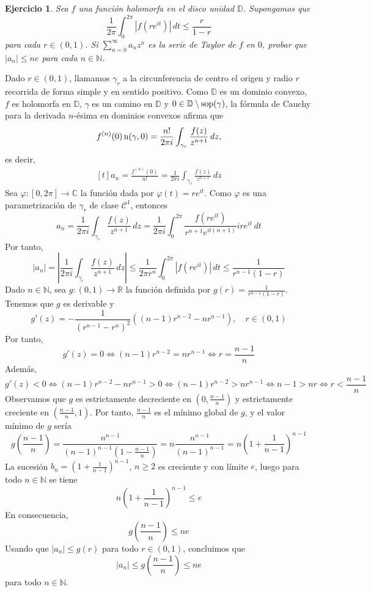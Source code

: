 \documentclass[11pt]{report}
\makeatletter
\renewenvironment{proof}[1][\proofname]{\par
  \pushQED{\qed}%
  \normalfont \topsep\z@skip %
  \trivlist
  \item[\hskip\labelsep
        \itshape
    #1\@addpunct{.}]\ignorespaces
}{%
  \popQED\endtrivlist\@endpefalse
}
\newcommand{\R}{\mathbb R}
\newcommand{\N}{\mathbb N}
\newcommand{\C}{\mathbb C}
\newcommand{\D}{\mathbb D}
\newtheorem{exercise}{Ejercicio}
\makeatother
\begin{document}
\begin{exercise}
Sea $f$ una función holomorfa en el disco unidad $\D$. Supongamos que
\[\frac{1}{2\pi} \int_0^{2\pi} |f(re^{it})| \, dt \leq \frac{r}{1-r}\]
para cada $r \in (0,1)$. Si $\sum_{n=0}^\infty a_nz^n$ es la serie de Taylor de $f$ en $0$, probar que $|a_n| \leq ne$ para cada $n \in \N$.
\end{exercise}

\begin{proof}
Dado $r \in (0,1)$, llamamos $\gamma_r$ a la circunferencia de centro el origen y radio $r$ recorrida de forma simple y en sentido positivo. Como $\D$ es un dominio convexo, $f$ es holomorfa en $\D$, $\gamma$ es un camino en $\D$ y $0 \in \D \setminus \textup{sop}(\gamma)$, la fórmula de Cauchy para la derivada $n$-ésima en dominios convexos afirma que
\[f^{(n)}(0) \, \textup{n}(\gamma,0) = \frac{n!}{2\pi i} \int_{\gamma_r}\frac{f(z)}{z^{n+1}} \, dz,\]
es decir,
\[\begin{aligned}[t]
a_n = \frac{f^{(n)}(0)}{n!} = \frac{1}{2\pi i}  \int_{\gamma_r} \frac{f(z)}{z^{n+1}} \, dz
\end{aligned}\]
Sea $\varphi \colon [0,2\pi] \to \C$ la función dada por $\varphi(t)=re^{it}$. Como $\varphi$ es una parametrización de $\gamma_r$ de clase $\mathcal{C}^1$, entonces
\[a_n = \frac{1}{2\pi i}\int_{\gamma_r} \frac{f(z)}{z^{n+1}} \, dz = \frac{1}{2\pi i}\int_0^{2\pi} \frac{f(re^{it})}{r^{n+1}e^{it(n+1)}}ire^{it} \, dt\]
Por tanto,
\[|a_n| = \left|\frac{1}{2\pi i}\int_{\gamma_r} \frac{f(z)}{z^{n+1}} \, dz\right| \leq \frac{1}{2\pi r^n} \int_{0}^{2\pi} |f(re^{it})|\, dt \leq \frac{1}{r^{n-1}(1-r)}\]
Dado $n \in \N$, sea $g \colon (0,1) \to \R$ la función definida por $g(r) = \frac{1}{r^{n-1}(1-r)}$. Tenemos que $g$ es derivable y 
\[g'(z) = -\frac{1}{(r^{n-1}-r^n)^2}\left((n-1)r^{n-2}-nr^{n-1}\right), \quad r \in (0,1)\]
Por tanto,
\[g'(z) = 0 \iff (n-1)r^{n-2}=nr^{n-1} \iff r = \frac{n-1}{n}\]
Además,
\[g'(z) < 0 \iff (n-1)r^{n-2}-nr^{n-1} > 0 \iff (n-1)r^{n-2} > nr^{n-1} \iff n-1 > nr \iff r < \frac{n-1}{n}\]
Observamos que $g$ es estrictamente decreciente en $(0,\frac{n-1}{n})$ y estrictamente creciente en $(\frac{n-1}{n},1)$. Por tanto, $\frac{n-1}{n}$ es el mínimo global de $g$, y el valor mínimo de $g$ sería
\[g\left(\frac{n-1}{n}\right) = \frac{n^{n-1}}{(n-1)^{n-1}(1-\frac{n-1}{n})} =n\frac{n^{n-1}}{(n-1)^{n-1}} = n\left(1+\frac{1}{n-1}\right)^{n-1}\]
La sucesión $b_n = (1+\frac{1}{n-1})^{n-1}$, $n \geq 2$ es creciente y con límite $e$, luego para todo $n \in \N$ se tiene \[n(1+\frac{1}{n-1})^{n-1} \leq e\] En consecuencia,
\[g\left(\frac{n-1}{n}\right) \leq ne\]
Usando que $|a_n| \leq g(r)$ para todo $r \in (0,1)$, concluimos que
\[|a_n| \leq g\left(\frac{n-1}{n}\right) \leq ne\]
para todo $n \in \N$.
\end{proof}
\end{document}
